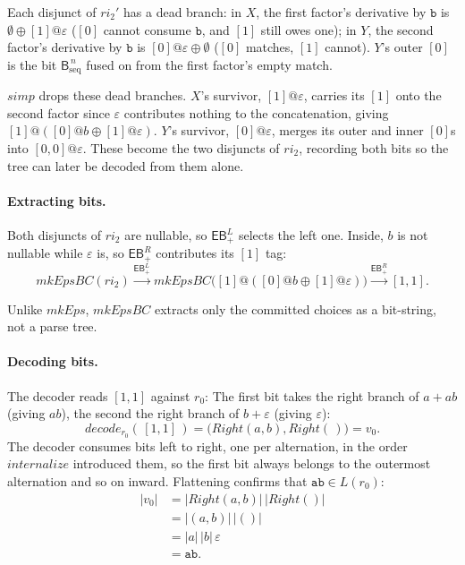 Each disjunct of $\mathit{ri}_2'$ has a dead branch: in $X$, the first
factor's derivative by $\mathtt{b}$ is $\emptyset \oplus [1]@\varepsilon$
($[0]$ cannot consume $\mathtt{b}$, and $[1]$ still owes one); in $Y$, the
second factor's derivative by $\mathtt{b}$ is $[0]@\varepsilon \oplus
\emptyset$ ($[0]$ matches, $[1]$ cannot). $Y$'s outer $[0]$ is the bit
$\mathsf{B}_{\mathrm{seq}}^{\,n}$ fused on from the first factor's empty
match.

$\mathit{simp}$ drops these dead branches. $X$'s survivor, $[1]@\varepsilon$,
carries its $[1]$ onto the second factor since $\varepsilon$ contributes
nothing to the concatenation, giving $[1]@([0]@b \oplus [1]@\varepsilon)$.
$Y$'s survivor, $[0]@\varepsilon$, merges its outer and inner $[0]$s into
$[0,0]@\varepsilon$. These become the two disjuncts of $\mathit{ri}_2$,
recording both bits so the tree can later be decoded from them alone.

%

\paragraph{Extracting bits.}
Both disjuncts of $\mathit{ri}_2$ are nullable, 
so $\mathsf{EB}_{+}^{L}$ selects the left one. 
Inside, $b$ is not nullable while $\varepsilon$ is, 
so $\mathsf{EB}_{+}^{R}$ contributes its $[1]$ tag:
{\small
\begin{equation}\label{eq:dpbc-mkepsbc}
\mathit{mkEpsBC}(\mathit{ri}_2)
  \xrightarrow{\mathsf{EB}_{+}^{L}}
  \mathit{mkEpsBC}\big(
    [1]@([0]@b \oplus [1]@\varepsilon)
  \big)
  \xrightarrow{\mathsf{EB}_{+}^{R}}
  [1,1].
\end{equation}
}

Unlike $\mathit{mkEps}$, $\mathit{mkEpsBC}$ extracts only the
committed choices as a bit-string, not a parse tree.

%

\paragraph{Decoding bits.}
The decoder reads $[1,1]$ against $r_0$: 
The first bit takes the right branch of $a+ab$ (giving $ab$), 
the second the right branch of $b+\varepsilon$ (giving $\varepsilon$):
\begin{equation}\label{eq:dpbc-decode}
\mathit{decode}_{r_0}(\,[1,1]\,)
  = \big(
      \mathit{Right}(a,b),
      \mathit{Right}(\,)
    \big)
  = v_0.
\end{equation}
The decoder consumes bits left to right, one per alternation, in the
order $\mathit{internalize}$ introduced them, so the first bit always
belongs to the outermost alternation and so on inward.
Flattening confirms that $\mathtt{ab} \in L(r_0)$:
\[
\begin{aligned}
|v_0|
  &= |\mathit{Right}(a,b)|\,
     |\mathit{Right}()| \\
  &= |(a,b)|\,|()| \\
  &= |a|\,|b|\,\varepsilon \\
  &= \mathtt{ab}.
\end{aligned}
\]
